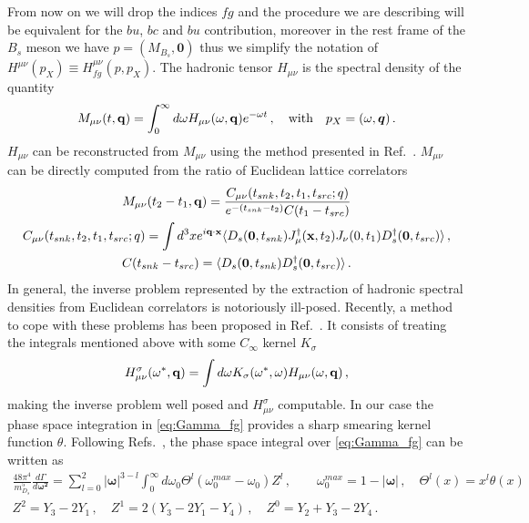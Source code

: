 From now on we will drop the indices $fg$ and the procedure we are describing will be equivalent for the $bu$, $bc$ and $bu$ contribution,
moreover in the rest frame of the $B_s$ meson we have $p=(M_{B_s},\bm{0})$ thus we simplify the notation of
$H^{\mu\nu}(p_X)\equiv H^{\mu\nu}_{fg}(p,p_X)$.
The hadronic tensor $H_{\mu\nu}$ is
the spectral density of the quantity
\begin{equation}
  M_{\mu\nu}(t,{\bf q})= \int_0^{\infty}d \omega H_{\mu\nu} (\omega,{\bf q}) e^{-\omega t}\,,\quad \text{with}\quad p_X=(\omega,\bm{q})\,.
\end{equation}
$H_{\mu\nu}$ can be reconstructed from $M_{\mu\nu}$ using the method presented in
Ref.~\cite{Hansen:2019idp}. $M_{\mu\nu}$ can be directly computed from the
ratio of Euclidean lattice correlators
\begin{gather}
  M_{\mu\nu}(t_2-t_1,{\bf q})=\frac{C_{\mu\nu}(t_{snk},t_2,t_1,t_{src};q)}{e^{-(t_{snk}-t_2)}  C(t_1-t_{src}) }\label{eq:ratio_4pt_2pt}\\
  \label{eq:4pt}
  C_{\mu\nu}(t_{snk},t_2,t_1,t_{src};q)=\int d^3x e^{i{\bf q}\cdot {\bf x}}
  \langle D_s({\bf 0}, t_{snk}) J^{\dagger}_\mu({\bf x},t_2)  J_\nu(0,t_1)
  D_s^\dagger({\bf 0}, t_{src})\rangle\,,\\
  \label{eq:2pt}
  C(t_{snk}-t_{src}) =  \langle D_s({\bf 0}, t_{snk})
  D_s^\dagger({\bf 0}, t_{src})\rangle\,.
\end{gather}
In general, the inverse problem represented by the extraction of
hadronic spectral densities from Euclidean correlators is notoriously
ill-posed. Recently, a method to cope with these problems has been
proposed in Ref.~\cite{Hansen:2019idp}. It consists of treating the
integrals mentioned above with some $C_\infty$ kernel $K_\sigma$
\begin{equation}
  H^\sigma_{\mu\nu}(\omega^*, {\bf q})= \int d \omega K_\sigma( \omega^*,\omega ) H_{\mu\nu}(\omega, {\bf q})\,,
\end{equation}
making the inverse problem well posed and $H^\sigma_{\mu\nu}$ computable.
In our case the phase space integration in \eqref{eq:Gamma_fg}
provides a sharp smearing kernel function $\theta$. Following
Refs.~\cite{Gambino:2020crt, Gambino:2022dvu}, the phase space integral over
\eqref{eq:Gamma_fg} can be written as
\begin{gather}
  \frac{48 \pi^4}{m_{D_s}^5}\frac{d\Gamma}{d \bm{ \omega^2} }
  =\sum_{l=0}^2 |\bm{\omega}|^{3-l}\int_0^{\infty}d \omega_0 \Theta^l(\omega_0^{max}-\omega_0) Z^l\,,\quad\quad {\omega}_0^{max}=1-|\bm{\omega}|\,,\quad\Theta^l(x)=x^l\theta(x)\\
  Z^2=Y_3-2Y_1\,,\quad Z^1=2(Y_3-2Y_1-Y_4)\,,\quad Z^0=Y_2+Y_3-2Y_4\,.
\end{gather}
